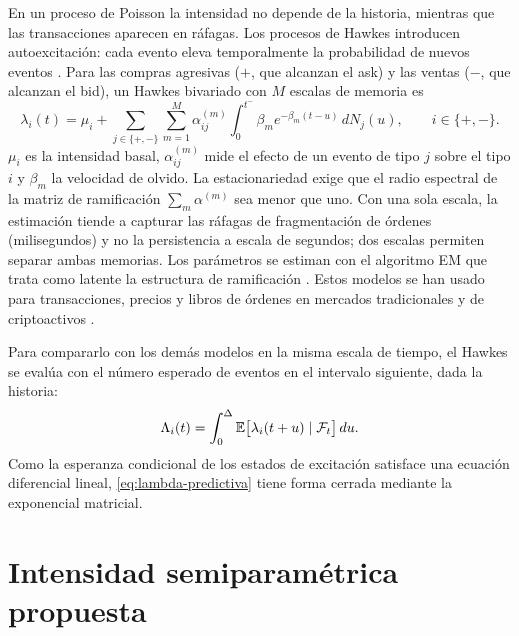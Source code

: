 En un proceso de Poisson la intensidad no depende de la historia, mientras que las transacciones aparecen en ráfagas. Los procesos de Hawkes introducen autoexcitación: cada evento eleva temporalmente la probabilidad de nuevos eventos \citep{Hawkes1971,BacryHawkes2015}. Para las compras agresivas ($+$, que alcanzan el ask) y las ventas ($-$, que alcanzan el bid), un Hawkes bivariado con $M$ escalas de memoria es
\begin{equation}
 \lambda_i(t)=\mu_i+\sum_{j\in\{+,-\}}\sum_{m=1}^{M}\alpha^{(m)}_{ij}\int_0^{t^-}\beta_m e^{-\beta_m(t-u)}\,dN_j(u),
 \qquad i\in\{+,-\}.
 \label{eq:hawkes-multi}
\end{equation}
$\mu_i$ es la intensidad basal, $\alpha^{(m)}_{ij}$ mide el efecto de un evento de tipo $j$ sobre el tipo $i$ y $\beta_m$ la velocidad de olvido. La estacionariedad exige que el radio espectral de la matriz de ramificación $\sum_m\alpha^{(m)}$ sea menor que uno. Con una sola escala, la estimación tiende a capturar las ráfagas de fragmentación de órdenes (milisegundos) y no la persistencia a escala de segundos; dos escalas permiten separar ambas memorias. Los parámetros se estiman con el algoritmo EM que trata como latente la estructura de ramificación \citep{VeenSchoenberg2008,Ozaki1979}. Estos modelos se han usado para transacciones, precios y libros de órdenes en mercados tradicionales y de criptoactivos \citep{Bowsher2007,LuAbergel2018,RambaldiEtAl2017,MorariuPatrichiPakkanen2022,CestariEtAl2023}.

Para compararlo con los demás modelos en la misma escala de tiempo, el Hawkes se evalúa con el número esperado de eventos en el intervalo siguiente, dada la historia:
\begin{equation}
 \Lambda_i(t)=\int_0^{\Delta}\operatorname{\mathbb{E}}\bigl[\lambda_i(t+u)\mid\mathcal F_t\bigr]\,du .
 \label{eq:lambda-predictiva}
\end{equation}
Como la esperanza condicional de los estados de excitación satisface una ecuación diferencial lineal, \eqref{eq:lambda-predictiva} tiene forma cerrada mediante la exponencial matricial.

\section{Intensidad semiparamétrica propuesta}
\label{sec:curva-distancia}

